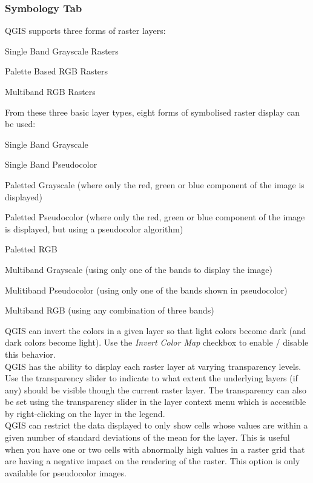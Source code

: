 \documentclass[10pt,english]{article}
\begin{document}
\begin{onehalfspace}
\subsubsection{Symbology Tab}


QGIS supports three forms of raster layers:
\begin{compactitem}
\item Single Band Grayscale Rasters
\item Palette Based RGB Rasters
\item Multiband RGB Rasters
\end{compactitem}

From these three basic layer types, eight forms of symbolised raster display can be used:
\begin{compactenum}

\item Single Band Grayscale
\item Single Band Pseudocolor
\item Paletted Grayscale (where only the red, green or blue component of the image is displayed)
\item Paletted Pseudocolor (where only the red, green or blue component of the image is displayed, but using a pseudocolor algorithm)
\item Paletted RGB
\item Multiband Grayscale (using only one of the bands to display the image)
\item Mulitiband Pseudocolor (using only one of the bands shown in pseudocolor)
\item Multiband RGB (using any combination of three bands)
\end{compactenum}
\smallskip
QGIS can invert the colors in a given layer so that light colors become dark (and dark colors become light). Use the \textsl{Invert Color Map} checkbox to enable / disable this behavior.\\

QGIS has the ability to display each raster layer at varying transparency levels. Use the transparency slider to indicate to what extent the underlying layers (if any) should be visible though the current raster layer. The transparency can also be set using the transparency slider in the layer context menu which is accessible by right-clicking on the layer in the legend.\\

QGIS can restrict the data displayed to only show cells whose values are within a given number of standard deviations of the mean for the layer. This is useful when you have one or two cells with abnormally high values in a raster grid that are having a negative impact on the rendering of the raster. This option is only available for pseudocolor images.\\


\end{onehalfspace}
\end{document}
